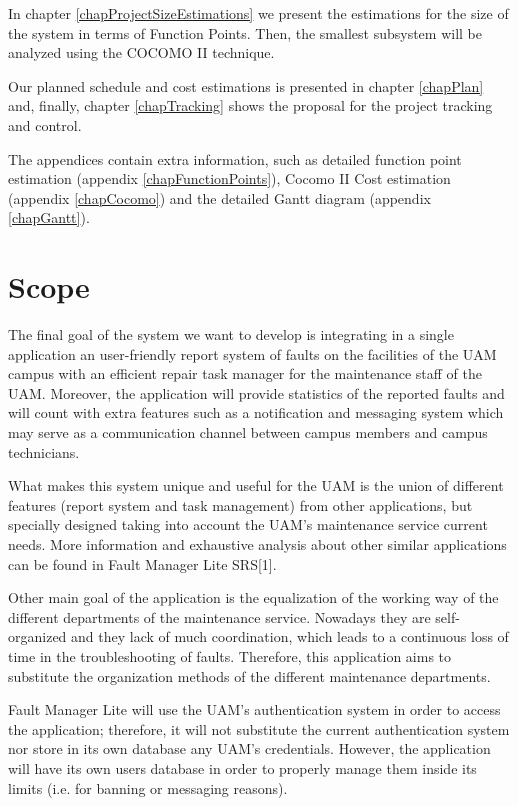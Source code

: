\documentclass[11pt]{report}
\begin{document}
In chapter \ref{chapProjectSizeEstimations} we present the estimations for the size of the system in terms of Function Points. Then, the smallest subsystem will be analyzed using the COCOMO II technique. 

Our planned schedule and cost estimations is presented in chapter \ref{chapPlan} and, finally, chapter \ref{chapTracking} shows the proposal for the project tracking and control.

The appendices contain extra information, such as detailed function point estimation (appendix \ref{chapFunctionPoints}), Cocomo II Cost estimation (appendix \ref{chapCocomo}) and the detailed Gantt diagram (appendix \ref{chapGantt}).

\section{Scope}

The final goal of the system we want to develop is integrating in a single application an user-friendly report system of faults on the facilities of the UAM campus with an efficient repair task manager for the maintenance staff of the UAM. Moreover, the application will provide statistics of the reported faults and will count with extra features such as a notification and messaging system which may serve as a communication channel between campus members and campus technicians. 

What makes this system unique and useful for the UAM is the union of different features (report system and task management) from other applications, but specially designed taking into account the UAM's maintenance service current needs. More information and exhaustive analysis about other similar applications can be found in Fault Manager Lite SRS[1].

Other main goal of the application is the equalization of the working way of the different departments of the maintenance service. Nowadays they are self-organized and they lack of much coordination, which leads to a continuous loss of time in the troubleshooting of faults. Therefore, this application aims to substitute the organization methods of the different maintenance departments.

Fault Manager Lite will use the UAM's authentication system in order to access the application; therefore, it will not substitute the current authentication system nor store in its own database any UAM's credentials. However, the application will have its own users database in order to properly manage them inside its limits (i.e. for banning or messaging reasons).
\end{document}
